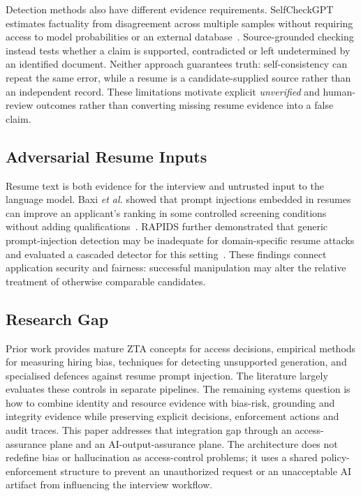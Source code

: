 \documentclass[conference]{IEEEtran}
\begin{document}
Detection methods also have different evidence requirements. SelfCheckGPT estimates factuality from disagreement across multiple samples without requiring access to model probabilities or an external database~\cite{manakul2023selfcheck}. Source-grounded checking instead tests whether a claim is supported, contradicted or left undetermined by an identified document. Neither approach guarantees truth: self-consistency can repeat the same error, while a resume is a candidate-supplied source rather than an independent record. These limitations motivate explicit \emph{unverified} and human-review outcomes rather than converting missing resume evidence into a false claim.

\subsection{Adversarial Resume Inputs}

Resume text is both evidence for the interview and untrusted input to the language model. Baxi \emph{et al.} showed that prompt injections embedded in resumes can improve an applicant's ranking in some controlled screening conditions without adding qualifications~\cite{baxi2026prompt}. RAPIDS further demonstrated that generic prompt-injection detection may be inadequate for domain-specific resume attacks and evaluated a cascaded detector for this setting~\cite{augey2026rapids}. These findings connect application security and fairness: successful manipulation may alter the relative treatment of otherwise comparable candidates.

\subsection{Research Gap}

Prior work provides mature ZTA concepts for access decisions, empirical methods for measuring hiring bias, techniques for detecting unsupported generation, and specialised defences against resume prompt injection. The literature largely evaluates these controls in separate pipelines. The remaining systems question is how to combine identity and resource evidence with bias-risk, grounding and integrity evidence while preserving explicit decisions, enforcement actions and audit traces. This paper addresses that integration gap through an access-assurance plane and an AI-output-assurance plane. The architecture does not redefine bias or hallucination as access-control problems; it uses a shared policy-enforcement structure to prevent an unauthorized request or an unacceptable AI artifact from influencing the interview workflow.
\end{document}
